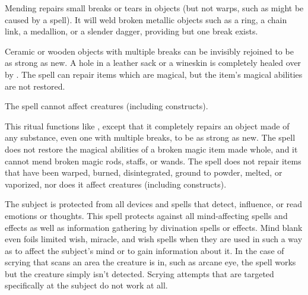 \begin{spelleffect}
Mending repairs small breaks or tears in objects (but not warps, such as might be caused by a  spell). It will weld broken metallic objects such as a ring, a chain link, a medallion, or a slender dagger, providing but one break exists.
\par Ceramic or wooden objects with multiple breaks can be invisibly rejoined to be as strong as new. A hole in a leather sack or a wineskin is completely healed over by . The spell can repair items which are magical, but the item's magical abilities are not restored. 
\end{spelleffect}
\begin{spellnotes}
The spell cannot affect creatures (including constructs).
\end{spellnotes}

\begin{spelleffect}
This ritual functions like , except that it completely repairs an object made of any substance, even one with multiple breaks, to be as strong as new. The spell does not restore the magical abilities of a broken magic item made whole, and it cannot mend broken magic rods, staffs, or wands. The spell does not repair items that have been warped, burned, disintegrated, ground to powder, melted, or vaporized, nor does it affect creatures (including constructs).
\end{spelleffect}

\spellrng{\rngclose}
\spelldur{\durext}
\begin{spelleffect}
The subject is protected from all devices and spells that detect, influence, or read emotions or thoughts. This spell protects against all mind-affecting spells and effects as well as information gathering by divination spells or effects. Mind blank even foils limited wish, miracle, and wish spells when they are used in such a way as to affect the subject's mind or to gain information about it. In the case of scrying that scans an area the creature is in, such as arcane eye, the spell works but the creature simply isn't detected. Scrying attempts that are targeted specifically at the subject do not work at all.
\end{spelleffect}

